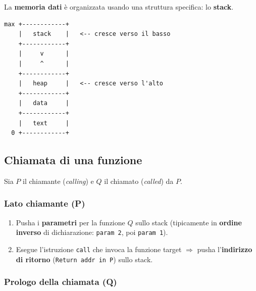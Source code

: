La \textbf{memoria dati} \`e organizzata usando una struttura specifica: lo \textbf{stack}.

\begin{verbatim}
max +------------+
    |   stack    |   <-- cresce verso il basso
    +------------+
    |     v      |
    |     ^      |
    +------------+
    |   heap     |   <-- cresce verso l'alto
    +------------+
    |   data     |
    +------------+
    |   text     |
  0 +------------+
\end{verbatim}


\subsection{Chiamata di una funzione}

Sia $P$ il chiamante (\textit{calling}) e $Q$ il chiamato (\textit{called}) da $P$.

\subsubsection{Lato chiamante (P)}

\begin{enumerate}
  \item Pusha i \textbf{parametri} per la funzione $Q$ sullo stack (tipicamente in \textbf{ordine inverso} di dichiarazione: \texttt{param 2}, poi \texttt{param 1}).
  \item Esegue l'istruzione \texttt{call} che invoca la funzione target $\Rightarrow$ pusha l'\textbf{indirizzo di ritorno} (\texttt{Return addr in P}) sullo stack.
\end{enumerate}

\subsubsection{Prologo della chiamata (Q)}


